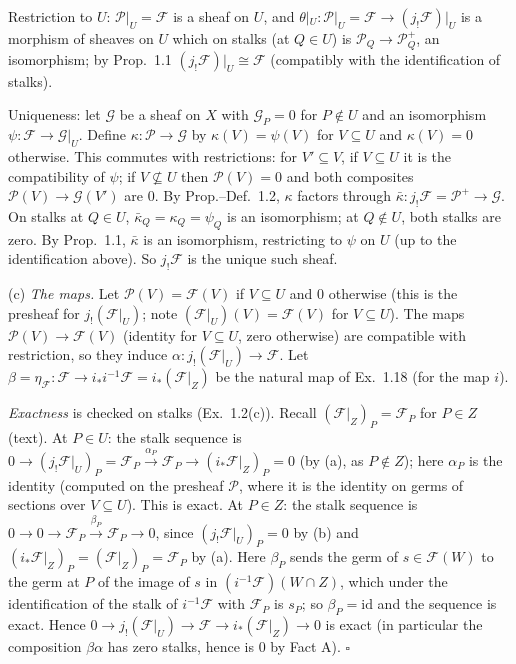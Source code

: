 \documentclass[11pt]{article}
\begin{document}
Restriction to $U$: $\mathcal P|_U=\mathcal F$ is a sheaf on $U$, and $\theta|_U\colon\mathcal P|_U=\mathcal F\to(j_!\mathcal F)|_U$ is a morphism of sheaves on $U$ which on stalks (at $Q\in U$) is $\mathcal P_Q\to\mathcal P^+_Q$, an isomorphism; by Prop.~1.1 $(j_!\mathcal F)|_U\cong\mathcal F$ (compatibly with the identification of stalks).

Uniqueness: let $\mathcal G$ be a sheaf on $X$ with $\mathcal G_P=0$ for $P\notin U$ and an isomorphism $\psi\colon\mathcal F\to\mathcal G|_U$. Define $\kappa\colon\mathcal P\to\mathcal G$ by $\kappa(V)=\psi(V)$ for $V\subseteq U$ and $\kappa(V)=0$ otherwise. This commutes with restrictions: for $V'\subseteq V$, if $V\subseteq U$ it is the compatibility of $\psi$; if $V\not\subseteq U$ then $\mathcal P(V)=0$ and both composites $\mathcal P(V)\to\mathcal G(V')$ are $0$. By Prop.--Def.~1.2, $\kappa$ factors through $\bar\kappa\colon j_!\mathcal F=\mathcal P^+\to\mathcal G$. On stalks at $Q\in U$, $\bar\kappa_Q=\kappa_Q=\psi_Q$ is an isomorphism; at $Q\notin U$, both stalks are zero. By Prop.~1.1, $\bar\kappa$ is an isomorphism, restricting to $\psi$ on $U$ (up to the identification above). So $j_!\mathcal F$ is the unique such sheaf.

(c) \emph{The maps.} Let $\mathcal P(V)=\mathcal F(V)$ if $V\subseteq U$ and $0$ otherwise (this is the presheaf for $j_!(\mathcal F|_U)$; note $(\mathcal F|_U)(V)=\mathcal F(V)$ for $V\subseteq U$). The maps $\mathcal P(V)\to\mathcal F(V)$ (identity for $V\subseteq U$, zero otherwise) are compatible with restriction, so they induce $\alpha\colon j_!(\mathcal F|_U)\to\mathcal F$. Let $\beta=\eta_{\mathcal F}\colon\mathcal F\to i_*i^{-1}\mathcal F=i_*(\mathcal F|_Z)$ be the natural map of Ex.~1.18 (for the map $i$).

\emph{Exactness} is checked on stalks (Ex.~1.2(c)). Recall $(\mathcal F|_Z)_P=\mathcal F_P$ for $P\in Z$ (text). At $P\in U$: the stalk sequence is $0\to(j_!\mathcal F|_U)_P=\mathcal F_P\xrightarrow{\alpha_P}\mathcal F_P\to(i_*\mathcal F|_Z)_P=0$ (by (a), as $P\notin Z$); here $\alpha_P$ is the identity (computed on the presheaf $\mathcal P$, where it is the identity on germs of sections over $V\subseteq U$). This is exact. At $P\in Z$: the stalk sequence is $0\to0\to\mathcal F_P\xrightarrow{\beta_P}\mathcal F_P\to0$, since $(j_!\mathcal F|_U)_P=0$ by (b) and $(i_*\mathcal F|_Z)_P=(\mathcal F|_Z)_P=\mathcal F_P$ by (a). Here $\beta_P$ sends the germ of $s\in\mathcal F(W)$ to the germ at $P$ of the image of $s$ in $(i^{-1}\mathcal F)(W\cap Z)$, which under the identification of the stalk of $i^{-1}\mathcal F$ with $\mathcal F_P$ is $s_P$; so $\beta_P=\mathrm{id}$ and the sequence is exact. Hence $0\to j_!(\mathcal F|_U)\to\mathcal F\to i_*(\mathcal F|_Z)\to0$ is exact (in particular the composition $\beta\alpha$ has zero stalks, hence is $0$ by Fact A). \hfill$\square$
\end{document}
